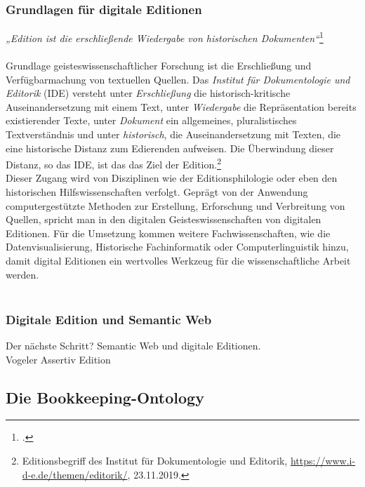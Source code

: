 \documentclass[12pt,a4paper]{article}
\begin{document}
\subsubsection{Grundlagen für digitale Editionen}

\textit{„Edition ist die erschließende Wiedergabe von historischen Dokumenten“}\footcite[][S.76]{sahle2003edition}
\\
\\
Grundlage geisteswissenschaftlicher Forschung ist die Erschließung und Verfügbarmachung von textuellen Quellen. Das \textit{Institut für Dokumentologie und Editorik} (IDE) versteht unter \textit{Erschließung} die historisch-kritische Auseinandersetzung mit einem Text, unter \textit{Wiedergabe} die Repräsentation bereits existierender Texte, unter \textit{Dokument} ein allgemeines, pluralistisches Textverständnis und unter \textit{historisch}, die Auseinandersetzung mit Texten, die eine historische Distanz zum Edierenden aufweisen. Die Überwindung dieser Distanz, so das IDE, ist das das Ziel der Edition.\footnote{Editionsbegriff des Institut für Dokumentologie und Editorik, \url{https://www.i-d-e.de/themen/editorik/}, 23.11.2019.}
\\
Dieser Zugang wird von Disziplinen wie der Editionsphilologie oder eben den historischen Hilfswissenschaften verfolgt. Geprägt von der Anwendung computergestützte Methoden zur Erstellung, Erforschung und Verbreitung von Quellen, spricht man in den digitalen Geisteswissenschaften von digitalen Editionen. Für die Umsetzung kommen weitere Fachwissenschaften, wie die Datenvisualisierung, Historische Fachinformatik oder Computerlinguistik hinzu, damit digital Editionen ein wertvolles Werkzeug für die wissenschaftliche Arbeit werden.
\\
\\


\subsubsection{Digitale Edition und Semantic Web}

Der nächste Schritt? Semantic Web und digitale Editionen.
\\
Vogeler Assertiv Edition

\newpage
\subsection{Die Bookkeeping-Ontology}
\label{BK}
\end{document}
